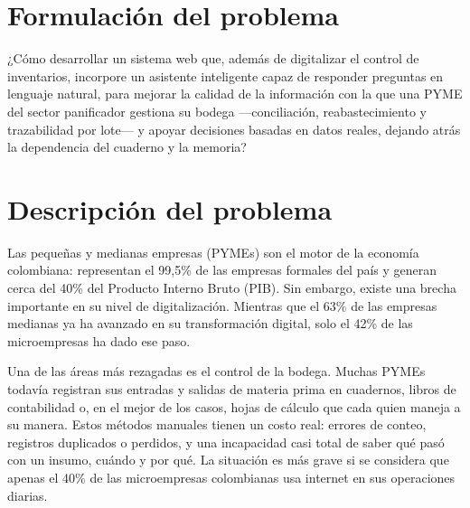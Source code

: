 

\section{Formulación del problema}

¿Cómo desarrollar un sistema web que, además de digitalizar el control de inventarios, incorpore un asistente inteligente capaz de responder preguntas en lenguaje natural, para mejorar la calidad de la información con la que una PYME del sector panificador gestiona su bodega ---conciliación, reabastecimiento y trazabilidad por lote--- y apoyar decisiones basadas en datos reales, dejando atrás la dependencia del cuaderno y la memoria?

\section{Descripción del problema}

Las pequeñas y medianas empresas (PYMEs) son el motor de la economía colombiana: representan el 99,5\% de las empresas formales del país y generan cerca del 40\% del Producto Interno Bruto (PIB).\cite{bbva2024mipymes} Sin embargo, existe una brecha importante en su nivel de digitalización. Mientras que el 63\% de las empresas medianas ya ha avanzado en su transformación digital, solo el 42\% de las microempresas ha dado ese paso.\cite{innpulsa_transformacion}

Una de las áreas más rezagadas es el control de la bodega. Muchas PYMEs todavía registran sus entradas y salidas de materia prima en cuadernos, libros de contabilidad o, en el mejor de los casos, hojas de cálculo que cada quien maneja a su manera.\cite{bbva2024mipymes} Estos métodos manuales tienen un costo real: errores de conteo, registros duplicados o perdidos, y una incapacidad casi total de saber qué pasó con un insumo, cuándo y por qué. La situación es más grave si se considera que apenas el 40\% de las microempresas colombianas usa internet en sus operaciones diarias.\cite{bbva2024mipymes}


